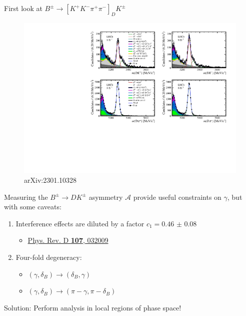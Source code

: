 \documentclass{beamer}
\begin{document}
\begin{frame}{First look at $B^\pm\to[K^+K^-\pi^+\pi^-]_DK^\pm$}
  \begin{figure}
    \centering
    \includegraphics[width = 1.0\textwidth,trim={0 7cm 0 0},clip=true]{Plots/d2kkpipi_fiveL_allDP_GLW.pdf}
    \caption*{\tiny arXiv:2301.10328}
  \end{figure}
  \vspace{-0.5cm}
  \begin{center}
    {\large Measuring the $B^\pm\to DK^\pm$ asymmetry $\mathcal{A}$ provide useful constraints on $\gamma$, but with some caveats:}
  \end{center}
  \begin{enumerate}
    \item{Interference effects are diluted by a factor $c_1 = \SI{0.46(8)}{}$}
    \begin{itemize}
      \item{\href{https://journals.aps.org/prd/abstract/10.1103/PhysRevD.107.032009}{Phys. Rev. D \textbf{107}, 032009}}
    \end{itemize}
    \item{Four-fold degeneracy:}
    \begin{itemize}
      \item{$(\gamma, \delta_B)\to(\delta_B, \gamma)$}
      \item{$(\gamma, \delta_B)\to(\pi - \gamma, \pi - \delta_B)$}
    \end{itemize}
  \end{enumerate}
  \begin{center}
    \large Solution: Perform analysis in local regions of phase space!
  \end{center}
\end{frame}
\end{document}
